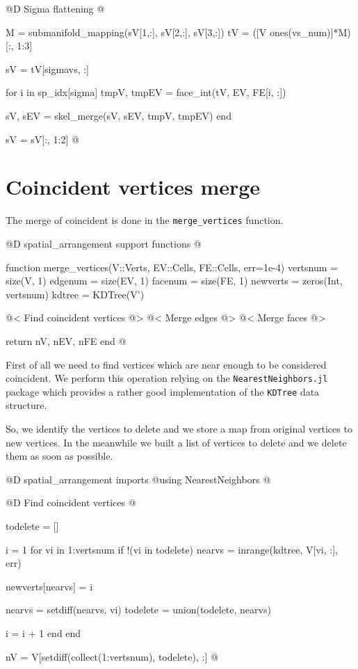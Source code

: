 @D Sigma flattening
@{M = submanifold_mapping(sV[1,:], sV[2,:], sV[3,:])
tV = ([V ones(vs_num)]*M)[:, 1:3]

sV = tV[sigmavs, :]

for i in sp_idx[sigma]
    tmpV, tmpEV = face_int(tV, EV, FE[i, :])
    
    sV, sEV = skel_merge(sV, sEV, tmpV, tmpEV)
end

sV = sV[:, 1:2]
@}



\section{Coincident vertices merge}
\label{sec:3D_merge_vertices}

The merge of coincident is done in the \texttt{merge\_vertices}
function.

@D spatial\_arrangement support functions
@{function merge_vertices(V::Verts, EV::Cells, FE::Cells, err=1e-4)
    vertsnum = size(V, 1)
    edgenum = size(EV, 1)
    facenum = size(FE, 1)
    newverts = zeros(Int, vertsnum)
    kdtree = KDTree(V')

    @< Find coincident vertices @>
    @< Merge edges @>
    @< Merge faces @>

    return nV, nEV, nFE
end
@}

First of all we need to find vertices which are near enough
to be considered coincident. We perform this operation
relying on the \texttt{NearestNeighbors.jl} package\cite{NearestNeighbors}
which provides a rather good implementation of the \texttt{KDTree} data structure.

So, we identify the vertices to delete and we store a map
from original vertices to new vertices. In the meanwhile
we built a list of vertices to delete and we delete them 
as soon as possible.

@D spatial\_arrangement imports
@{using NearestNeighbors
@}

@D Find coincident vertices
@{todelete = []

i = 1
for vi in 1:vertsnum
    if !(vi in todelete)
        nearvs = inrange(kdtree, V[vi, :], err)

        newverts[nearvs] = i

        nearvs = setdiff(nearvs, vi)
        todelete = union(todelete, nearvs)

        i = i + 1
    end
end

nV = V[setdiff(collect(1:vertsnum), todelete), :]
@}

